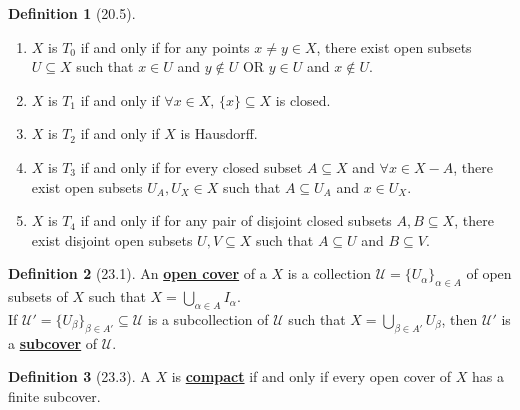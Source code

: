 \documentclass{article}
\newcommand{\Iff}{if and only if}
\newcommand{\script}[1]{\ensuremath{\mathscr{#1}}}
\newcommand{\define}[1]{\textbf{\underline{#1}}}
\newcommand{\Ts}[2]{\ensuremath{(#1,#2)}}
\newcommand{\Union}{\bigcup}
\renewcommand{\Subset}{\subseteq}
\theoremstyle{definition}
\newtheorem*{defn}{Definition}
\theoremstyle{remark}
\begin{document}
{        \begin{defn}[20.5]\hfill
            \begin{enumerate}
                \item $X$ is \define{$T_0$} \Iff{} for any points $x\neq y \in X$, there exist open subsets $U \Subset X$ such that $x \in U$ and $y \notin U$ OR $y \in U$ and $x \notin U$. 
                \item $X$ is \define{$T_1$} \Iff{} $\forall x\in X, \, \{x\} \Subset X$ is closed.
                \item $X$ is \define{$T_2$} \Iff{} $X$ is Hausdorff.
                \item $X$ is \define{$T_3$} \Iff{} for every closed subset $A \Subset X$ and $\forall x \in X-A$, there exist open subsets $U_A,U_X \in X$ such that $A \Subset U_A$ and $x \in U_X$.
                \item $X$ is \define{$T_4$} \Iff{} for any pair of disjoint closed subsets $A,B \Subset X$, there exist disjoint open subsets $U,V \Subset X$ such that $A \Subset U$ and $B \Subset V$.
            \end{enumerate}
        \end{defn}
        
        \begin{defn}[23.1]
                An \define{open cover} of a \Ts{} $X$ is a collection $\script{U}=\{U_\alpha\}_{\alpha \in A}$ of open subsets of $X$ such that $X=\Union_{\alpha \in A}  I_\alpha$.\\
                If $\script{U'}=\{U_\beta\}_{\beta \in A'} \Subset \script{U}$ is a subcollection of $\script{U}$ such that $X=\Union_{\beta \in A'}U_\beta$, then $\script{U'}$ is a \define{subcover} of $\script{U}$.
        \end{defn}
        
        \begin{defn}[23.3]
            A \Ts{} $X$ is \define{compact} \Iff{} every open cover of $X$ has a finite subcover.
        \end{defn}
        
        
    }
    \newpage
    
\end{document}
